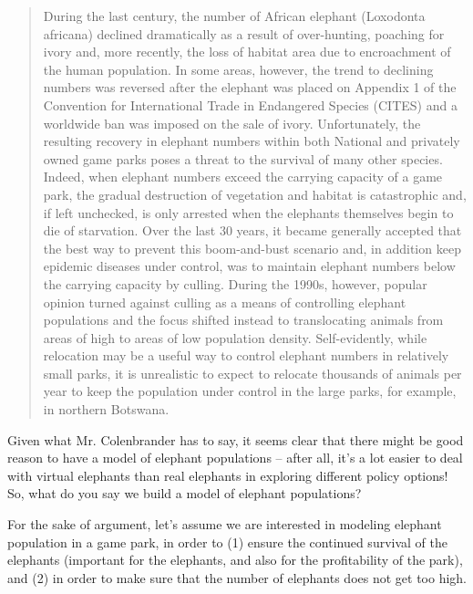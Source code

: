 \begin{quote}
During the last century, the number of African elephant (Loxodonta africana) 
declined dramatically as a result of over-hunting, poaching for ivory and, 
more recently, the loss of habitat area due to encroachment of the human population. 
In some areas, however, the trend to declining numbers was reversed after the elephant was 
placed on Appendix 1 of the Convention for International Trade in Endangered Species 
(CITES) and a worldwide ban was imposed on the sale of ivory. Unfortunately, the resulting 
recovery in elephant numbers within both National and privately owned game parks poses 
a threat to the survival of many other species. Indeed, when elephant numbers exceed the 
carrying capacity of a game park, the gradual destruction of vegetation and habitat is 
catastrophic and, if left unchecked, is only arrested when the elephants themselves
 begin to die of starvation. Over the last 30 years, it became generally accepted that 
 the best way to prevent this boom-and-bust scenario and, in addition keep epidemic 
 diseases under control, was to maintain elephant numbers below the carrying capacity 
 by culling. During the 1990s, however, popular opinion turned against culling as a 
 means of controlling elephant populations and the focus shifted instead to translocating 
 animals from areas of high to areas of low population density. Self-evidently, while 
 relocation may be a useful way to control elephant numbers in relatively small 
 parks, it is unrealistic to expect to relocate thousands of animals per year to keep the 
 population under control in the large parks, for example, in northern Botswana. \\
\end{quote}
 
Given what Mr. Colenbrander has to say, it seems clear that there might be good reason to have a model of elephant populations -- after all, it's a lot easier to deal with virtual elephants than real elephants in exploring different policy options!  So, what do you say we build a model of elephant populations?

For the sake of argument, let's assume we are interested in modeling elephant population in a game park, in order to (1) ensure the continued survival of the elephants (important for the elephants, and also for the profitability of the park), and (2) in order to make sure that the number of elephants does not get too high.  


